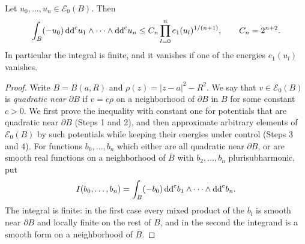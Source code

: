 \begin{theorem}\label{thm:bounded-mixed-local-energy}
Let $u_0,\ldots,u_n\in\mathcal E_0(B)$. Then
\begin{equation}\label{eq:bounded-mixed-local-energy}
 \int_B(-u_0)\,\mathrm{dd}^{\mathrm{c}} u_1\wedge\cdots\wedge\mathrm{dd}^{\mathrm{c}} u_n
 \leq C_n\prod_{l=0}^n e_1(u_l)^{1/(n+1)},
 \qquad C_n=2^{n+2}.
\end{equation}
In particular the integral is finite, and it vanishes if one of the energies $e_1(u_l)$ vanishes.
\end{theorem}
\begin{proof}
Write $B=B(a,R)$ and $\rho(z)=|z-a|^2-R^2$. We say that $v\in\mathcal E_0(B)$ is \emph{quadratic near $\partial B$} if $v=c\rho$ on a neighborhood of $\partial B$ in $B$ for some constant $c>0$. We first prove the inequality with constant one for potentials that are quadratic near $\partial B$ (Steps 1 and 2), and then approximate arbitrary elements of $\mathcal E_0(B)$ by such potentials while keeping their energies under control (Steps 3 and 4). For functions $b_0,\ldots,b_n$ which either are all quadratic near $\partial B$, or are smooth real functions on a neighborhood of $\overline B$ with $b_2,\ldots,b_n$ plurisubharmonic, put
\[
 I(b_0,\ldots,b_n)
       =\int_B(-b_0)\,\mathrm{dd}^{\mathrm{c}} b_1\wedge\cdots\wedge\mathrm{dd}^{\mathrm{c}} b_n.
\]
The integral is finite: in the first case every mixed product of the $b_l$ is smooth near $\partial B$ and locally finite on the rest of $B$, and in the second the integrand is a smooth form on a neighborhood of $\overline B$.


\end{proof}
